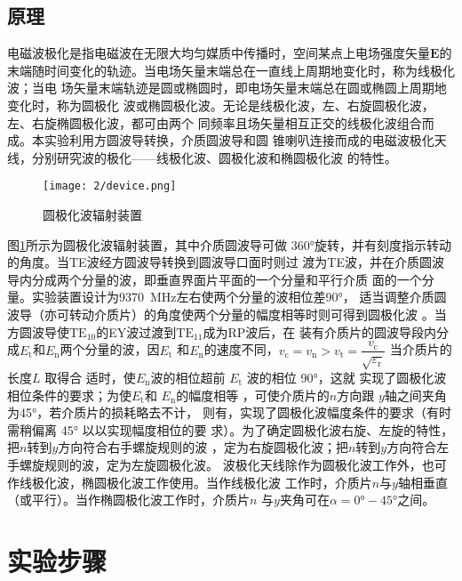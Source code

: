 \documentclass[../main]{subfiles}
\begin{document}
\subsection{原理}%
\label{sub:\arabic{chapter}原理}

电磁波极化是指电磁波在无限大均匀媒质中传播时，空间某点上电场强度矢量$ \bm{E} $的
末端随时间变化的轨迹。当电场矢量末端总在一直线上周期地变化时，称为线极化波；当电
场矢量末端轨迹是圆或椭圆时，即电场矢量末端总在圆或椭圆上周期地变化时，称为圆极化
波或椭圆极化波。无论是线极化波，左、右旋圆极化波，左、右旋椭圆极化波，都可由两个
同频率且场矢量相互正交的线极化波组合而成。本实验利用方圆波导转换，介质圆波导和圆
锥喇叭连接而成的电磁波极化天线，分别研究波的极化——线极化波、圆极化波和椭圆极化波
的特性。

\begin{figure}[htbp]
	\centering
	\texttt{[image: 2/device.png]}
	\caption{圆极化波辐射装置}
	\label{fig:圆极化波辐射装置}
\end{figure}

图\ref{fig:圆极化波辐射装置}所示为圆极化波辐射装置，其中介质圆波导可做
\ang{360;;}旋转，并有刻度指示转动的角度。当TE波经方圆波导转换到圆波导口面时则过
渡为TE波，并在介质圆波导内分成两个分量的波，即垂直界面片平面的一个分量和平行介质
面的一个分量。实验装置设计为\SI{9370}{\MHz}左右使两个分量的波相位差\ang{90;;}，
适当调整介质圆波导（亦可转动介质片）的角度使两个分量的幅度相等时则可得到圆极化波
。当方圆波导使$ \mathrm{TE}_{10} $的EY波过渡到$ \mathrm{TE}_{11} $成为RP波后，在
装有介质片的圆波导段内分成$ E_\mathrm{t} $和$ E_\mathrm{n} $两个分量的波，因$ E_\mathrm{t} $
和$ E_\mathrm{n} $的速度不同，$ v_\mathrm{c} = v_\mathrm{n} > v_\mathrm{t} =
\dfrac{v_\mathrm{c}}{\sqrt{\varepsilon_\mathrm{r}}} $ 当介质片的长度$ L $ 取得合
适时，使$ E_\mathrm{n} $波的相位超前 $ E_\mathrm{t} $ 波的相位 \ang{90;;}，这就
实现了圆极化波相位条件的要求；为使$ E_\mathrm{t} $和 $ E_\mathrm{n} $的幅度相等
，可使介质片的$ n $方向跟 $ y $轴之间夹角为\ang{45;;}，若介质片的损耗略去不计，
则有，实现了圆极化波幅度条件的要求（有时需稍偏离 \ang{45;;} 以以实现幅度相位的要
求）。为了确定圆极化波右旋、左旋的特性，把$ n $转到$ y $方向符合右手螺旋规则的波
，定为右旋圆极化波；把$ n $转到$ y $方向符合左手螺旋规则的波，定为左旋圆极化波。
波极化天线除作为圆极化波工作外，也可作线极化波，椭圆极化波工作使用。当作线极化波
工作时，介质片$ n $与$ y $轴相垂直（或平行）。当作椭圆极化波工作时，介质片$ n $
与$ y $夹角可在$ \alpha = \ang{0;;} - \ang{45;;} $之间。

\section{实验步骤}%
\label{sec:\arabic{chapter}实验步骤}
\end{document}
